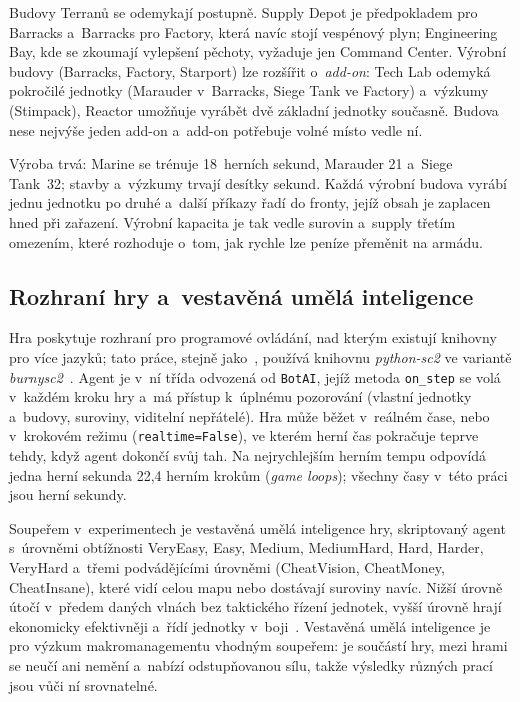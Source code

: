 Budovy Terranů se odemykají postupně. Supply Depot je předpokladem pro Barracks a~Barracks pro Factory, která navíc stojí vespénový plyn; Engineering Bay, kde se zkoumají vylepšení pěchoty, vyžaduje jen Command Center. Výrobní budovy (Barracks, Factory, Starport) lze rozšířit o~\emph{add-on}: Tech Lab odemyká pokročilé jednotky (Marauder v~Barracks, Siege Tank ve Factory) a~výzkumy (Stimpack), Reactor umožňuje vyrábět dvě základní jednotky současně. Budova nese nejvýše jeden add-on a~add-on potřebuje volné místo vedle ní.

Výroba trvá: Marine se trénuje 18~herních sekund, Marauder 21 a~Siege Tank~32; stavby a~výzkumy trvají desítky sekund. Každá výrobní budova vyrábí jednu jednotku po druhé a~další příkazy řadí do fronty, jejíž obsah je zaplacen hned při zařazení. Výrobní kapacita je tak vedle surovin a~supply třetím omezením, které rozhoduje o~tom, jak rychle lze peníze přeměnit na armádu.

\subsection{Rozhraní hry a~vestavěná umělá inteligence}

Hra poskytuje rozhraní pro programové ovládání, nad kterým existují knihovny pro více jazyků; tato práce, stejně jako~\cite{Orava2025}, používá knihovnu \emph{python-sc2} ve variantě \emph{burnysc2}~\cite{BurnySc2}. Agent je v~ní třída odvozená od \texttt{BotAI}, jejíž metoda \texttt{on\_step} se volá v~každém kroku hry a~má přístup k~úplnému pozorování (vlastní jednotky a~budovy, suroviny, viditelní nepřátelé). Hra může běžet v~reálném čase, nebo v~krokovém režimu (\texttt{realtime=False}), ve kterém herní čas pokračuje teprve tehdy, když agent dokončí svůj tah. Na nejrychlejším herním tempu odpovídá jedna herní sekunda 22,4 herním krokům (\emph{game loops}); všechny časy v~této práci jsou herní sekundy.

Soupeřem v~experimentech je vestavěná umělá inteligence hry, skriptovaný agent s~úrovněmi obtížnosti VeryEasy, Easy, Medium, MediumHard, Hard, Harder, VeryHard a~třemi podvádějícími úrovněmi (CheatVision, CheatMoney, CheatInsane), které vidí celou mapu nebo dostávají suroviny navíc. Nižší úrovně útočí v~předem daných vlnách bez taktického řízení jednotek, vyšší úrovně hrají ekonomicky efektivněji a~řídí jednotky v~boji~\cite{Orava2025}. Vestavěná umělá inteligence je pro výzkum makromanagementu vhodným soupeřem: je součástí hry, mezi hrami se neučí ani nemění a~nabízí odstupňovanou sílu, takže výsledky různých prací jsou vůči ní srovnatelné.

